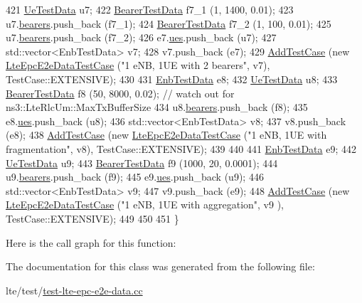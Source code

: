 \begin{DoxyCode}
421   \hyperlink{structUeTestData}{UeTestData} u7;
422   \hyperlink{structBearerTestData}{BearerTestData} f7\_1 (1, 1400, 0.01);
423   u7.\hyperlink{structUeTestData_ab02618dc9dfd673f397c313dae3df481}{bearers}.push\_back (f7\_1);
424   \hyperlink{structBearerTestData}{BearerTestData} f7\_2 (1, 100, 0.01);
425   u7.\hyperlink{structUeTestData_ab02618dc9dfd673f397c313dae3df481}{bearers}.push\_back (f7\_2);
426   e7.\hyperlink{structEnbTestData_a0b5de379df31368a33410980a16d2dd7}{ues}.push\_back (u7);
427   std::vector<EnbTestData> v7;
428   v7.push\_back (e7);
429   \hyperlink{classns3_1_1TestCase_a3718088e3eefd5d6454569d2e0ddd835}{AddTestCase} (\textcolor{keyword}{new} \hyperlink{classLteEpcE2eDataTestCase}{LteEpcE2eDataTestCase} (\textcolor{stringliteral}{"1 eNB, 1UE with 2 bearers"}, v7),
       TestCase::EXTENSIVE);
430 
431   \hyperlink{structEnbTestData}{EnbTestData} e8;
432   \hyperlink{structUeTestData}{UeTestData} u8;
433   \hyperlink{structBearerTestData}{BearerTestData} f8 (50, 8000, 0.02); \textcolor{comment}{// watch out for ns3::LteRlcUm::MaxTxBufferSize}
434   u8.\hyperlink{structUeTestData_ab02618dc9dfd673f397c313dae3df481}{bearers}.push\_back (f8);
435   e8.\hyperlink{structEnbTestData_a0b5de379df31368a33410980a16d2dd7}{ues}.push\_back (u8);
436   std::vector<EnbTestData> v8;
437   v8.push\_back (e8);
438   \hyperlink{classns3_1_1TestCase_a3718088e3eefd5d6454569d2e0ddd835}{AddTestCase} (\textcolor{keyword}{new} \hyperlink{classLteEpcE2eDataTestCase}{LteEpcE2eDataTestCase} (\textcolor{stringliteral}{"1 eNB, 1UE with fragmentation"}, 
      v8), TestCase::EXTENSIVE);
439 
440 
441   \hyperlink{structEnbTestData}{EnbTestData} e9;
442   \hyperlink{structUeTestData}{UeTestData} u9;
443   \hyperlink{structBearerTestData}{BearerTestData} f9 (1000, 20, 0.0001);
444   u9.\hyperlink{structUeTestData_ab02618dc9dfd673f397c313dae3df481}{bearers}.push\_back (f9);
445   e9.\hyperlink{structEnbTestData_a0b5de379df31368a33410980a16d2dd7}{ues}.push\_back (u9);
446   std::vector<EnbTestData> v9;
447   v9.push\_back (e9);
448   \hyperlink{classns3_1_1TestCase_a3718088e3eefd5d6454569d2e0ddd835}{AddTestCase} (\textcolor{keyword}{new} \hyperlink{classLteEpcE2eDataTestCase}{LteEpcE2eDataTestCase} (\textcolor{stringliteral}{"1 eNB, 1UE with aggregation"}, v9
      ), TestCase::EXTENSIVE);
449 
450 
451 \}
\end{DoxyCode}


Here is the call graph for this function\+:




The documentation for this class was generated from the following file\+:\begin{DoxyCompactItemize}
\item 
lte/test/\hyperlink{test-lte-epc-e2e-data_8cc}{test-\/lte-\/epc-\/e2e-\/data.\+cc}\end{DoxyCompactItemize}
